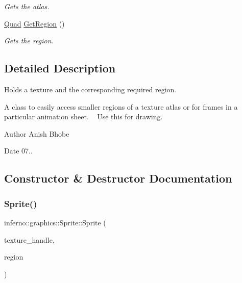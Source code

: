 \begin{DoxyCompactItemize}
\begin{DoxyCompactList}\small\item\em Gets the atlas. \end{DoxyCompactList}\item 
\mbox{\hyperlink{classinferno_1_1graphics_1_1_quad}{Quad}} \mbox{\hyperlink{classinferno_1_1graphics_1_1_sprite_ad2f468c9390d0d952f049daba69ef53f}{Get\+Region}} ()
\begin{DoxyCompactList}\small\item\em Gets the region. \end{DoxyCompactList}\end{DoxyCompactItemize}


\subsection{Detailed Description}
Holds a texture and the corresponding required region. 

A class to easily access smaller regions of a texture atlas or for frames in a particular animation sheet. ~\newline
Use this for drawing. \begin{DoxyAuthor}{Author}
Anish Bhobe 
\end{DoxyAuthor}
\begin{DoxyDate}{Date}
07.. 
\end{DoxyDate}


\subsection{Constructor \& Destructor Documentation}
\mbox{\label{classinferno_1_1graphics_1_1_sprite_a404b45a087a04018e5e2bc5c7b59ab67}} 
\subsubsection{\texorpdfstring{Sprite()}{Sprite()}\hspace{0.1cm}{\footnotesize\ttfamily [1/2]}}
{\footnotesize\ttfamily inferno\+::graphics\+::\+Sprite\+::\+Sprite (\begin{DoxyParamCaption}\item[{\mbox{\hyperlink{namespaceinferno_1_1graphics_a9d719bfbfedd17b9ace9b8d603ab5a38}{Texture\+Handle}}}]{texture\+\_\+handle,  }\item[{\mbox{\hyperlink{classinferno_1_1graphics_1_1_quad}{Quad}}}]{region }\end{DoxyParamCaption})\hspace{0.3cm}{\ttfamily [inline]}}



